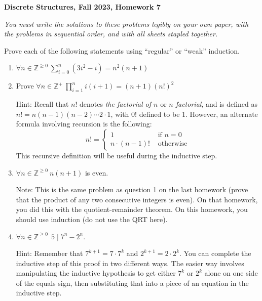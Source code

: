 \documentclass[12pt, letterpaper]{report}
\newcommand{\Z}{\mathbb{Z}}
\begin{document}
{\textbf{Discrete Structures, Fall 2023, Homework 7}}

\medbreak

\textit{You must write the solutions to these problems legibly on your own paper, with
the problems in sequential order, and with all sheets stapled together.}

\bigskip

Prove each of the following statements using ``regular'' or ``weak'' induction.

\begin{enumerate}

       
       \item $\forall n \in \Z^{\geq 0} \ \displaystyle \sum_{i=0}^n (3i^2-i) = n^2(n+1)$      

       \item Prove $\displaystyle \forall n \in \Z^+ \ \prod_{i=1}^n i(i+1) = (n+1)(n!)^2$

Hint: Recall that $n!$ denotes \emph{the factorial of $n$} or \emph{$n$ factorial}, and is defined as $n!=n(n-1)(n-2)\cdots2\cdot 1$, with $0!$ defined to be 1.  
However, an alternate
formula involving recursion is the following:
$$n! = \begin{cases} 1 &\text{ if } n= 0 \\
n \cdot (n-1)! &\text{ otherwise}\end{cases}$$
This recursive definition will be useful during the inductive step.     

\item $\forall n \in \Z^{\geq 0} \ n(n+1)$ is even.

Note: This is the same problem as question 1 on the last homework (prove that the product of any two consecutive integers is even). 
On that homework, you did this with the quotient-remainder theorem.  On this homework, you should use induction (do not use the QRT here).

\item $\forall n \in \Z^{\geq 0} \ \ 5 \mid 7^n - 2^n$.   

Hint: Remember that $7^{k+1} = 7\cdot 7^k$ and $2^{k+1} = 2\cdot 2^k$.  You can complete the inductive step of this 
proof in two different ways.  The easier way involves manipulating the inductive hypothesis to get either $7^k$ or $2^k$ alone
on one side of the equals sign, then substituting that into a piece of an equation in the inductive step.

\end{enumerate}

 
\end{document}
